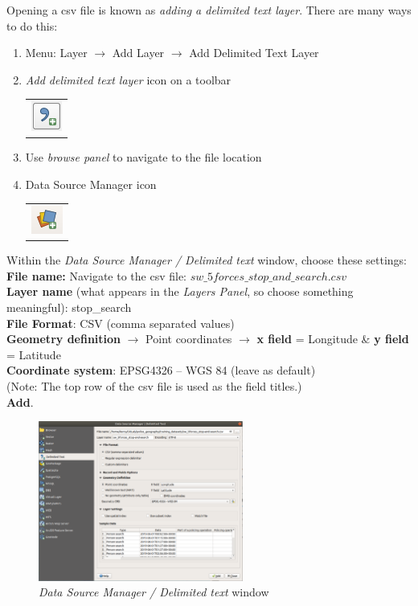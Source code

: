 Opening a csv file is known as \textit{adding a delimited text layer}. There are many ways to do this:
\begin{enumerate}[~~~1)]
	\item
	Menu: Layer $\rightarrow$ Add Layer $\rightarrow$ Add Delimited Text Layer	
	\item 
	\textit{Add delimited text layer} icon on a toolbar
	\begin{tabular}{@{}c@{}}\includegraphics[width=4ex]{images/add_delimited_text_layer_icon.png}\end{tabular}
	\item 
	Use \textit{browse panel} to navigate to the file location
	\item 
	Data Source Manager icon
	\begin{tabular}{@{}c@{}}\includegraphics[width=4ex]{images/data_source_manager_icon.png}\end{tabular}
\end{enumerate}

Within the \textit{Data Source Manager / Delimited text} window, choose these settings:\\
\textbf{File name:} Navigate to the csv file: $sw\_5forces\_stop\_and\_search.csv$\\
\textbf{Layer name} (what appears in the \textit{Layers Panel}, so choose something meaningful): stop\_search\\
\textbf{File Format}: CSV (comma separated values)\\
\textbf{Geometry definition} $\rightarrow$ Point coordinates $\rightarrow$  
\textbf{x field} = Longitude \& \textbf{y field} = Latitude\\
\textbf{Coordinate system}: EPSG4326 – WGS 84 (leave as default)\\
(Note: The top row of the csv file is used as the field titles.)\\
\textbf{Add}.\\

\begin{figure}[!h]
	\centering
	\includegraphics[width=0.6\textwidth]{images/add_delimited_text_stop_and_search.png}
	\caption{\textit{Data Source Manager / Delimited text} window}
	\label{ft_fig_firstfig3}
\end{figure}

